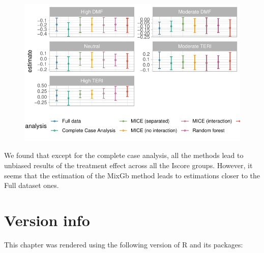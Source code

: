 \documentclass[
  letterpaper,
  DIV=11,
  numbers=noendperiod]{scrreprt}
\begin{document}
\begin{figure}[H]

{\centering \includegraphics{chapter_09_files/figure-pdf/het plot-1.pdf}

}

\end{figure}

We found that except for the complete case analysis, all the methods
lead to unbiased results of the treatment effect across all the Iscore
groups. However, it seems that the estimation of the MixGb method leads
to estimations closer to the Full dataset ones.

\hypertarget{version-info-3}{%
\section*{Version info}\label{version-info-3}}


This chapter was rendered using the following version of R and its
packages:
\end{document}
